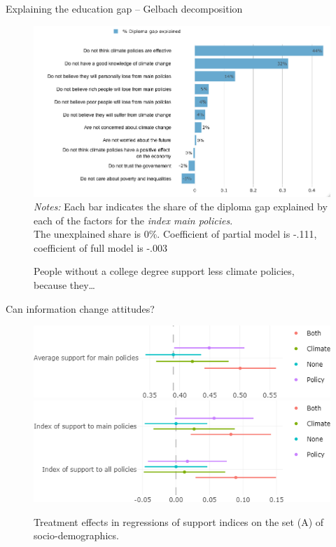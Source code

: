 \begin{framefont}{\small}
\begin{frame}{Explaining the education gap -- Gelbach decomposition}%

\begin{figure}[h!]
\caption{People without a college degree support less climate policies, because they…}
\includegraphics[width=.65\textwidth]{../figures/FR/gelbach_college_no_fairness_index_main_policies} \\
{\tiny \textit{Notes:} Each bar indicates the share of the diploma gap explained by each of the factors for the \textit{index main policies}.\\ The unexplained share is 0\%. Coefficient of partial model is -.111, coefficient of full model is -.003}
\end{figure}
\end{frame}

\begin{frame}{Can information change attitudes?}
\begin{figure}
	\caption{Treatment effects in regressions of support indices on the set (A) of socio-demographics.}
	\includegraphics[width=.7\textwidth]{../figures/FR/policies_support_by_treatment.png}
	\includegraphics[width=.7\textwidth]{../figures/FR/indices_policies_by_treatment_origin0.png}
\end{figure}
\end{frame}


\end{framefont}
